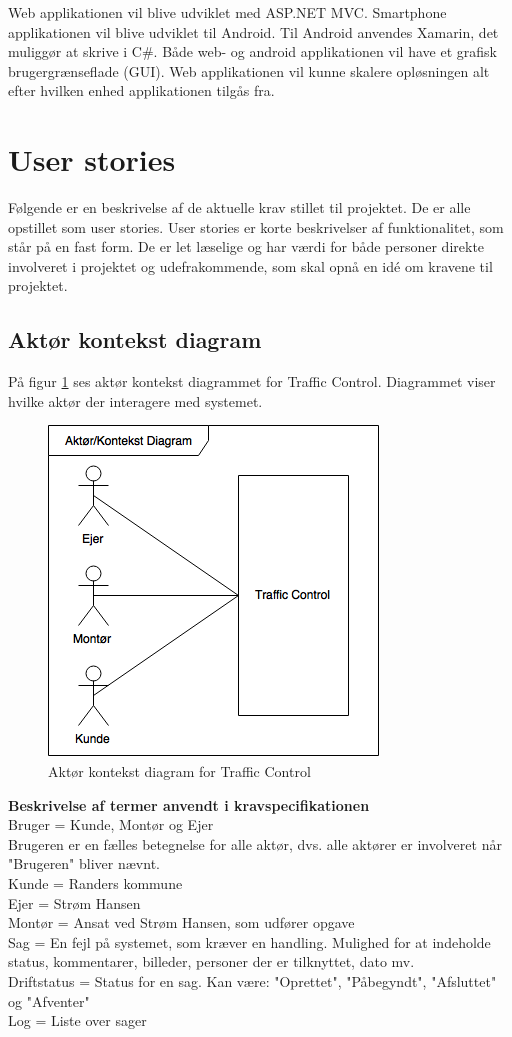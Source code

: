 			Web applikationen vil blive udviklet med ASP.NET MVC. 
			Smartphone applikationen vil blive udviklet til Android. Til Android anvendes Xamarin, det muliggør at skrive i C\#.
			Både web- og android applikationen vil have et grafisk brugergrænseflade (GUI). Web applikationen vil kunne skalere opløsningen alt efter hvilken enhed applikationen tilgås fra.\\

\section{User stories} \label{sec:UserStories}
Følgende er en beskrivelse af de aktuelle krav stillet til projektet. De er alle opstillet som user stories. User stories er korte beskrivelser af funktionalitet, som står på en fast form. De er let læselige og har værdi for både personer direkte involveret i projektet og udefrakommende, som skal opnå en idé om kravene til projektet. 

\subsection{Aktør kontekst diagram}\label{sec:aktor}
På figur \ref{fig:AktorKontekst} ses aktør kontekst diagrammet for Traffic Control. Diagrammet viser hvilke aktør der interagere med systemet.
	\begin{figure}[H]
		\centering
		\includegraphics[width=0.4\linewidth]{Kravspecifikation/AktorDiagram}
		\caption{Aktør kontekst diagram for Traffic Control}
		\label{fig:AktorKontekst}
	\end{figure}


\textbf{Beskrivelse af termer anvendt i kravspecifikationen}\\
Bruger = Kunde, Montør og Ejer\\
\indent Brugeren er en fælles betegnelse for alle aktør, dvs. alle aktører er involveret når "Brugeren" bliver nævnt. \\
Kunde = Randers kommune\\
Ejer = Strøm Hansen\\
Montør = Ansat ved Strøm Hansen, som udfører opgave\\
Sag = En fejl på systemet, som kræver en handling. Mulighed for at indeholde status, kommentarer, billeder, personer der er tilknyttet, dato mv.\\
Driftstatus = Status for en sag. Kan være: "Oprettet", "Påbegyndt", "Afsluttet" og "Afventer"\\
Log = Liste over sager\\

